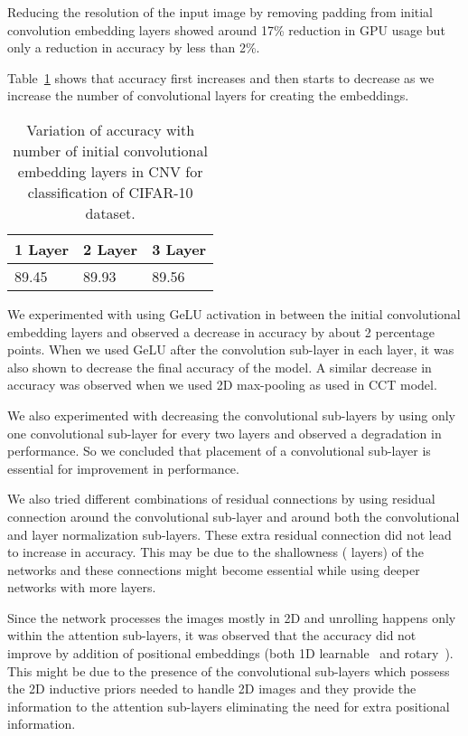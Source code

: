 \documentclass{article}
\begin{document}
Reducing the resolution of the input image by removing padding from initial convolution embedding layers showed around 17\% reduction in GPU usage but only a reduction in accuracy by less than 2\%. 


Table~\ref{tab:cnn} shows that accuracy first increases and then starts to decrease as we increase the number of convolutional layers for creating the embeddings.
\begin{table}[]
\centering
\begin{tabular}{@{}lll@{}}
\toprule
1 Layer & 2 Layer & 3 Layer \\ \midrule
89.45   & 89.93   & 89.56   \\ \bottomrule
\end{tabular}
\vspace{2mm}
\caption{Variation of accuracy with number of initial convolutional embedding layers in CNV for classification of CIFAR-10 dataset.}
\label{tab:cnn}
\end{table}

We experimented with using GeLU activation in between the initial convolutional embedding layers and observed a decrease in accuracy by about 2 percentage points. When we used GeLU after the convolution sub-layer in each layer, it was also shown to decrease the final accuracy of the model.  A similar decrease in accuracy was observed when we used 2D max-pooling as used in CCT model.  

We also experimented with decreasing the convolutional sub-layers by using only one convolutional sub-layer for every two layers and observed a degradation in performance. So we concluded that placement of a convolutional sub-layer is essential for improvement in performance.

We also tried different combinations of residual connections by using residual connection around the convolutional sub-layer and around both the convolutional and layer normalization sub-layers. These extra residual connection did not lead to increase in accuracy. This may be due to the shallowness ( layers) of the networks and these connections might become essential while using deeper networks with more layers. 

Since the network processes the images mostly in 2D and unrolling happens only within the attention sub-layers, it was observed that the accuracy did not improve by addition of positional embeddings (both 1D learnable~\cite{dosovitskiy2021image} and rotary~\cite{su2021roformer}). This might be due to the presence of the convolutional sub-layers which possess the 2D inductive priors needed to handle 2D images and they provide the information to the attention sub-layers eliminating the need for extra positional information. 
\end{document}
